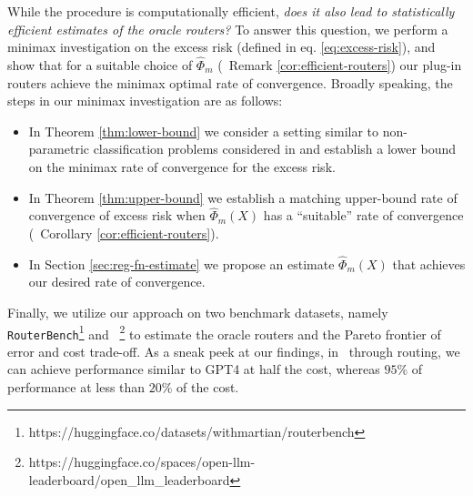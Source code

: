 While the procedure is computationally efficient, \emph{does it also lead to statistically efficient estimates of the oracle routers?} To answer this question, we perform a minimax investigation on the excess risk (defined in eq. \eqref{eq:excess-risk}), and show that for a suitable choice of $\widehat \Phi_m$ (\cf\ Remark \ref{cor:efficient-routers}) our plug-in routers achieve the minimax optimal rate of convergence. Broadly speaking, the steps in our minimax investigation are as follows: 
\begin{itemize}
    \item In Theorem \ref{thm:lower-bound} we consider a setting similar to non-parametric classification problems considered in \citet{audibert2007Fast} and establish a lower bound on the minimax rate of convergence for the excess risk.
    \item  In Theorem \ref{thm:upper-bound} we establish a matching upper-bound rate of convergence of excess risk when $\widehat \Phi_m(X)$ has a ``suitable'' rate of convergence (\cf\ Corollary \ref{cor:efficient-routers}). 
    \item In Section \ref{sec:reg-fn-estimate} we propose an estimate $\widehat \Phi_m(X)$ that achieves our desired rate of convergence. 
\end{itemize}
Finally, we utilize our approach on two benchmark datasets, namely \texttt{RouterBench}\footnote{https://huggingface.co/datasets/withmartian/routerbench}\citep{hu2024routerbench} and \openllm\
\footnote{https://huggingface.co/spaces/open-llm-leaderboard/open\_llm\_leaderboard} \citep{open-llm-leaderboard-v2}
to estimate the oracle routers and the Pareto frontier of error and cost trade-off. 
As a sneak peek at our findings, in \routerbench\ through routing, we can achieve performance similar to GPT4 at half the cost, whereas $95\%$ of performance at less than $20\%$ of the cost. 


